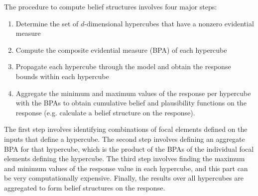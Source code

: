 
The procedure to compute belief structures involves four major steps:
\begin{enumerate}
  \setlength{\itemsep}{1pt}
  \setlength{\parskip}{0pt}
  \setlength{\parsep}{0pt}
\item Determine the set of $d$-dimensional hypercubes that have a nonzero 
evidential measure 
\item Compute the composite evidential measure (BPA) of each hypercube 
\item Propagate each hypercube through the model and obtain the response 
bounds within each hypercube
\item Aggregate the minimum and maximum values of the response per hypercube 
with the BPAs to obtain cumulative belief and plausibility functions 
on the response (e.g. calculate a belief structure on the response). 
\end{enumerate}

The first step involves identifying combinations of focal elements
defined on the inputs that define a hypercube. The second step
involves defining an aggregate BPA for that hypercube, which is the
product of the BPAs of the individual focal elements defining the
hypercube.  The third step involves finding the maximum and minimum
values of the response value in each hypercube, and this part can be
very computationally expensive.  Finally, the results over all
hypercubes are aggregated to form belief structures on the response.
